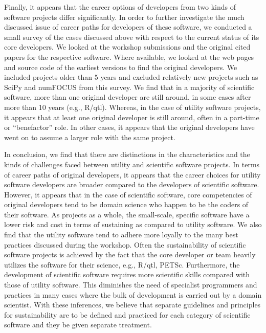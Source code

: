 \documentclass[11pt, oneside]{amsart}
\newcommand{\toolname}[1] {\textsf{#1}}
\begin{document}
Finally, it appears that the career options of developers from
two kinds of software projects differ significantly. In order to
further investigate the much discussed issue of career paths for
developers of these software, we conducted a small survey of the cases
discussed above with respect to the current status of its core
developers. We looked at the workshop submissions and the original
cited papers for the respective software. Where available, we looked
at the web pages and source code of the earliest versions to find the
original developers. We included projects older than 5 years and
excluded relatively new projects such as \toolname{SciPy} and
\toolname{numFOCUS} from this survey. We find that in a majority of
scientific software, more than one original developer are still
around, in some cases after more than 10 years (e.g.,
\toolname{R/qtl}).  Whereas, in the case of utility software projects,
it appears that at least one original developer is still around, often
in a part-time or ``benefactor'' role. In other cases, it appears that
the original developers have went on to assume a larger role with the
same project.

In conclusion, we find that there are distinctions in the
characteristics and the kinds of challenges faced between utility and
scientific software projects.  In terms of career paths of original
developers, it appears that the career choices for utility software
developers are broader compared to the developers of scientific
software. However, it appears that in the case of scientific software,
core competencies of original developers tend to be domain science who
happen to be the coders of their software. As projects as a whole, the
small-scale, specific software have a lower risk and cost in terms of
sustaining as compared to utility software. We also find that the
utility software tend to adhere more loyally to the many best
practices discussed during the workshop. Often the sustainability of
scientific software projects is achieved by the fact that the core
developer or team heavily utilizes the software for their science,
e.g., \toolname{R/qtl, PETSc}.  Furthermore, the development of
scientific software requires more scientific skills compared with
those of utility software. This diminishes the need of specialist
programmers and practices in many cases where the bulk of development
is carried out by a domain scientist. With these inferences, we
believe that separate guidelines and principles for sustainability are to
be defined and practiced for each category of scientific software and
they be given separate treatment.
\end{document}
